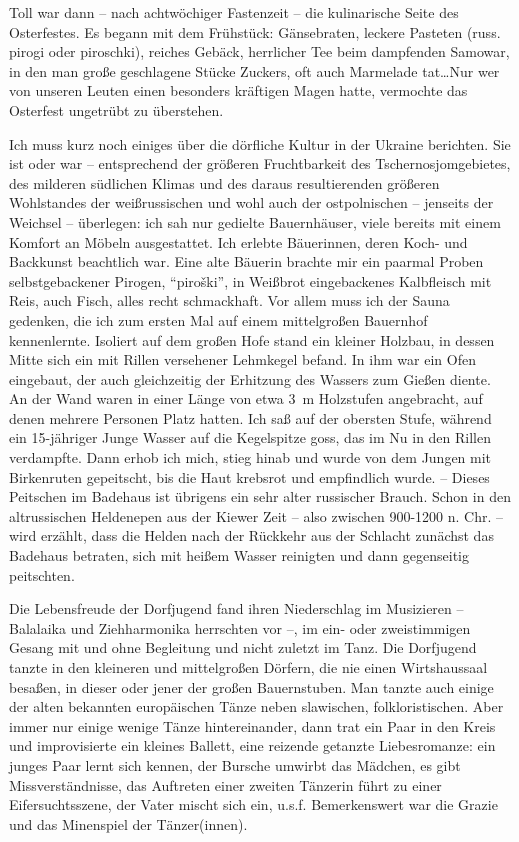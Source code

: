 Toll war dann -- nach achtwöchiger Fastenzeit -- die kulinarische Seite des Osterfestes. Es begann mit dem Frühstück: Gänsebraten, leckere Pasteten (russ. pirogi oder piroschki), reiches Gebäck, herrlicher Tee beim dampfenden Samowar, in den man große geschlagene Stücke Zuckers, oft auch Marmelade tat\dots Nur wer von unseren Leuten einen besonders kräftigen Magen hatte, vermochte das Osterfest ungetrübt zu überstehen.

Ich muss kurz noch einiges über die dörfliche Kultur in der Ukraine berichten. Sie ist oder war -- entsprechend der größeren Fruchtbarkeit des Tschernosjomgebietes, des milderen südlichen Klimas und des daraus resultierenden größeren Wohlstandes der weißrussischen und wohl auch der ostpolnischen -- jenseits der Weichsel -- überlegen: ich sah nur gedielte Bauernhäuser, viele bereits mit einem Komfort an Möbeln ausgestattet. Ich erlebte Bäuerinnen, deren Koch- und Backkunst beachtlich war. Eine alte Bäuerin brachte mir ein paarmal Proben selbstgebackener Pirogen, \enquote{piroški}, in Weißbrot eingebackenes Kalbfleisch mit Reis, auch Fisch, alles recht schmackhaft. Vor allem muss ich der Sauna gedenken, die ich zum ersten Mal auf einem mittelgroßen Bauernhof kennenlernte. Isoliert auf dem großen Hofe stand ein kleiner Holzbau, in dessen Mitte sich ein mit Rillen versehener Lehmkegel befand. In ihm war ein Ofen eingebaut, der auch gleichzeitig der Erhitzung des Wassers zum Gießen diente. An der Wand waren in einer Länge von etwa 3~m Holzstufen angebracht, auf denen mehrere Personen Platz hatten. Ich saß auf der obersten Stufe, während ein 15-jähriger Junge Wasser auf die Kegelspitze goss, das im Nu in den Rillen verdampfte. Dann erhob ich mich, stieg hinab und wurde von dem Jungen mit Birkenruten gepeitscht, bis die Haut krebsrot und empfindlich wurde. -- Dieses Peitschen im Badehaus ist übrigens ein sehr alter russischer Brauch. Schon in den altrussischen Heldenepen aus der Kiewer Zeit -- also zwischen 900-1200 n. Chr. -- wird erzählt, dass die Helden nach der Rückkehr aus der Schlacht zunächst das Badehaus betraten, sich mit heißem Wasser reinigten und dann gegenseitig peitschten.

Die Lebensfreude der Dorfjugend fand ihren Niederschlag im Musizieren -- Balalaika und Ziehharmonika herrschten vor --, im ein- oder zweistimmigen Gesang mit und ohne Begleitung und nicht zuletzt im Tanz. Die Dorfjugend tanzte in den kleineren und mittelgroßen Dörfern, die nie einen Wirtshaussaal besaßen, in dieser oder jener der großen Bauernstuben. Man tanzte auch einige der alten bekannten europäischen Tänze neben slawischen, folkloristischen. Aber immer nur einige wenige Tänze hintereinander, dann trat ein Paar in den Kreis und improvisierte ein kleines Ballett, eine reizende getanzte Liebesromanze: ein junges Paar lernt sich kennen, der Bursche umwirbt das Mädchen, es gibt Missverständnisse, das Auftreten einer zweiten Tänzerin führt zu einer Eifersuchtsszene, der Vater mischt sich ein, u.s.f. Bemerkenswert war die Grazie und das Minenspiel der Tänzer(innen).

